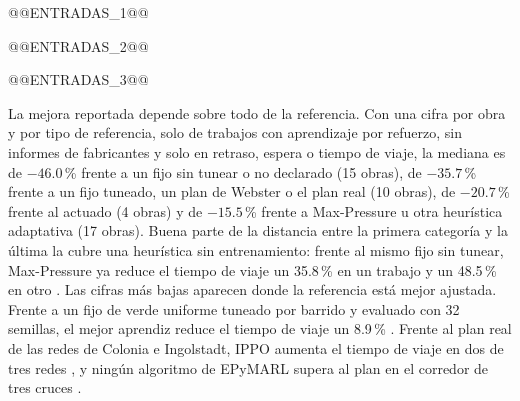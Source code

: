 @@ENTRADAS_1@@

@@ENTRADAS_2@@

@@ENTRADAS_3@@

La mejora reportada depende sobre todo de la referencia. Con una cifra
por obra y por tipo de referencia, solo de trabajos con aprendizaje por
refuerzo, sin informes de fabricantes y solo en retraso, espera o
tiempo de viaje, la mediana es de $-46.0$\,\% frente a un fijo sin
tunear o no declarado (15 obras), de $-35.7$\,\% frente a un fijo
tuneado, un plan de Webster o el plan real (10 obras), de $-20.7$\,\%
frente al actuado (4 obras) y de $-15.5$\,\% frente a Max-Pressure u
otra heurística adaptativa (17 obras). Buena parte de la distancia
entre la primera categoría y la última la cubre una heurística sin
entrenamiento: frente al mismo fijo sin tunear, Max-Pressure ya reduce
el tiempo de viaje un 35.8\,\% en un trabajo \citep{Wu2021_EfficientMP}
y un 48.5\,\% en otro \citep{Mei2024_LibSignal}. Las cifras más bajas
aparecen donde la referencia está mejor ajustada. Frente a un fijo de
verde uniforme tuneado por barrido y evaluado con 32 semillas, el mejor
aprendiz reduce el tiempo de viaje un 8.9\,\%
\citep{Genders2019_Framework}. Frente al plan real de las redes de
Colonia e Ingolstadt, IPPO aumenta el tiempo de viaje en dos de tres
redes \citep{Nguyen2025_TREX}, y ningún algoritmo de EPyMARL supera al
plan en el corredor de tres cruces \citep{Ault2022_EPyMARL}.
